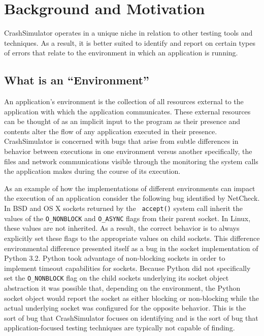 \section{Background and Motivation}

CrashSimulator operates in a unique niche in relation to other testing tools and techniques. As a result, it is better
suited to identify and report on certain types of errors that relate to the environment in which an application is
running.

    \subsection{What is an ``Environment''}

    An application's environment is the collection of all resources external to the application with which the
    application communicates.  These external resources can be thought of as an implicit input to the program as their
    presence and contents alter the flow of any application executed in their presence. CrashSimulator is concerned with
    bugs that arise from subtle differences in behavior between executions in one environment versus another
    specifically, the files and network communications visible through the monitoring the system calls the application
    makes during the course of its execution.

    As an example of how the implementations of different environments can impact the execution of an application
    consider the following bug identified by NetCheck.  In BSD and OS X sockets returned by the {\tt
      accept()} system call inherit the values of the {\tt O\_NONBLOCK} and {\tt O\_ASYNC} flags from their parent
    socket.  In Linux, these values are not inherited.  As a result, the correct behavior is to always explicitly
    set these flags to the appropriate values on child sockets.  This difference environmental difference presented
    itself as a bug in the socket implementation of Python 3.2.  Python took advantage of non-blocking sockets in
    order to implement timeout capabilities for sockets.  Because Python did not specifically set the {\tt O\_NONBLOCK}
    flag on the child sockets underlying its socket object abstraction it was possible that, depending on the
    environment, the Python socket object would report the socket as either blocking or non-blocking while the actual
    underlying socket was configured for the opposite behavior.  This is the sort of bug that CrashSimulator focuses on
    identifying and is the sort of bug that application-focused testing techniques are typically not capable of finding.


